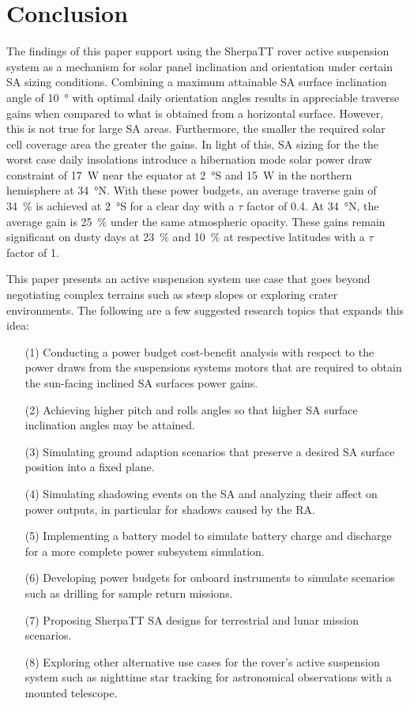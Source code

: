 \documentclass[twocolumn,letterpaper]{IEEEAerospaceCLS}  %
\begin{document}
\section{Conclusion}
The findings of this paper support using the SherpaTT rover active suspension system as a mechanism for solar panel inclination and orientation under certain \ac{SA} sizing conditions. Combining a maximum attainable \ac{SA} surface inclination angle of \SI{10}{\degree} with optimal daily orientation angles results in appreciable traverse gains when compared to what is obtained from a horizontal surface. However, this is not true for large \ac{SA} areas. Furthermore, the smaller the required solar cell coverage area the greater the gains. In light of this, \ac{SA} sizing for the the worst case daily insolations introduce a hibernation mode solar power draw constraint of \SI{17}{\watt} near the equator at \SI{2}{\degree}S and \SI{15}{\watt} in the northern hemisphere at \SI{34}{\degree}N. With these power budgets, an average traverse gain of \SI{34}{\percent} is achieved at \SI{2}{\degree}S for a clear day with a $\tau$ factor of 0.4. At \SI{34}{\degree}N, the average gain is \SI{25}{\percent} under the same atmospheric opacity. These gains remain significant on dusty days at \SI{23}{\percent} and \SI{10}{\percent} at respective latitudes with a $\tau$ factor of 1.

This paper presents an active suspension system use case that goes beyond negotiating complex terrains such as steep slopes or exploring crater environments. The following are a few suggested research topics that expands this idea:

\begin{itemize}
  \item [(1)] Conducting a power budget cost-benefit analysis with respect to the power draws from the suspensions systems motors that are required to obtain the sun-facing inclined \ac{SA} surfaces power gains.
  \item [(2)] Achieving higher pitch and rolls angles so that higher \ac{SA} surface inclination angles may be attained.
  \item [(3)] Simulating ground adaption scenarios that preserve a desired \ac{SA} surface position into a fixed plane.
  \item [(4)] Simulating shadowing events on the \ac{SA} and analyzing their affect on power outputs, in particular for shadows caused by the \ac{RA}.
  \item [(5)] Implementing a battery model to simulate battery charge and discharge for a more complete power subsystem simulation.
  \item [(6)] Developing power budgets for onboard instruments to simulate scenarios such as drilling for sample return missions.
  \item [(7)] Proposing SherpaTT \ac{SA} designs for terrestrial and lunar mission scenarios.
  \item [(8)] Exploring other alternative use cases for the rover's active suspension system such as nighttime star tracking for astronomical observations with a mounted telescope.
\end{itemize}
\end{document}
